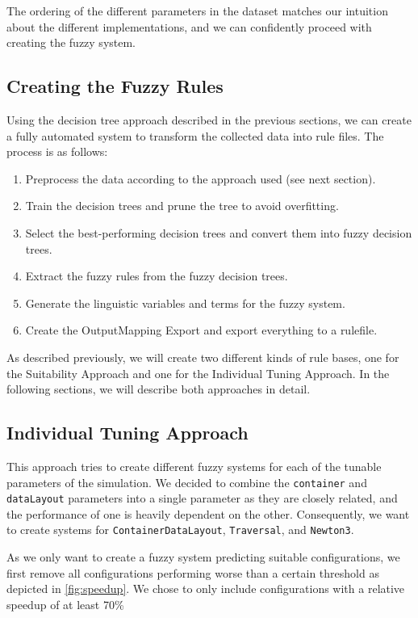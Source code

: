 The ordering of the different parameters in the dataset matches our intuition about the different implementations, and we can confidently proceed with creating the fuzzy system.



\subsection{Creating the Fuzzy Rules}

Using the decision tree approach described in the previous sections, we can create a fully automated system to transform the collected data into rule files. The process is as follows:

\begin{enumerate}
    \item Preprocess the data according to the approach used (see next section).
    \item Train the decision trees and prune the tree to avoid overfitting.
    \item Select the best-performing decision trees and convert them into fuzzy decision trees.
    \item Extract the fuzzy rules from the fuzzy decision trees.
    \item Generate the linguistic variables and terms for the fuzzy system.
    \item Create the OutputMapping Export and export everything to a rulefile.
\end{enumerate}

As described previously, we will create two different kinds of rule bases, one for the Suitability Approach and one for the Individual Tuning Approach. In the following sections, we will describe both approaches in detail.

\subsection{Individual Tuning Approach}

This approach tries to create different fuzzy systems for each of the tunable parameters of the simulation. We decided to combine the \texttt{container} and \texttt{dataLayout} parameters into a single parameter as they are closely related, and the performance of one is heavily dependent on the other. Consequently, we want to create systems for \texttt{ContainerDataLayout}, \texttt{Traversal}, and \texttt{Newton3}.

As we only want to create a fuzzy system predicting suitable configurations, we first remove all configurations performing worse than a certain threshold as depicted in \autoref{fig:speedup}. We chose to only include configurations with a relative speedup of at least 70\% %

